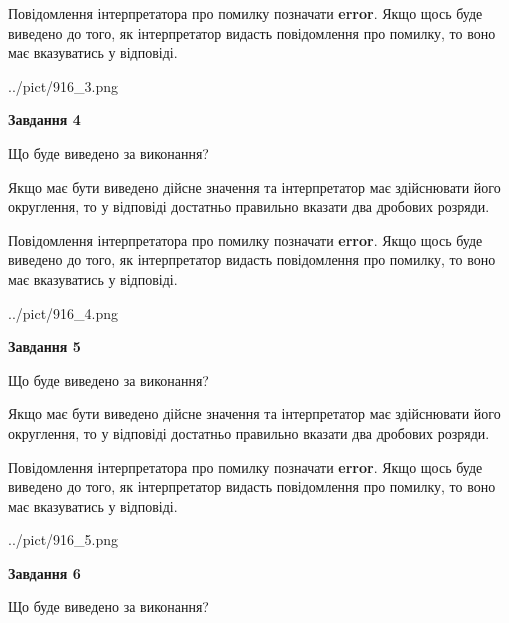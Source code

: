 \documentclass[12pt, ukrainian]{article}
\begin{document}
{\begin {Large}
Повідомлення інтерпретатора про помилку позначати \textbf{error}.
Якщо щось буде виведено до того, як інтерпретатор видасть повідомлення про помилку, 
то воно має вказуватись у відповіді. \par

\begin{center}
	{../pict/916_3.png}
\end{center}
\newpage

{\begin {center}\textbf{Завдання 4}\end {center}}\par
Що буде виведено за виконання? \par

Якщо має бути виведено дійсне значення та інтерпретатор має здійснювати його округлення, 
то у відповіді достатньо правильно вказати два дробових розряди.

Повідомлення інтерпретатора про помилку позначати \textbf{error}.
Якщо щось буде виведено до того, як інтерпретатор видасть повідомлення про помилку, 
то воно має вказуватись у відповіді. \par

\begin{center}
	{../pict/916_4.png}
\end{center}
\newpage

{\begin {center}\textbf{Завдання 5}\end {center}}\par
Що буде виведено за виконання? \par

Якщо має бути виведено дійсне значення та інтерпретатор має здійснювати його округлення, 
то у відповіді достатньо правильно вказати два дробових розряди.

Повідомлення інтерпретатора про помилку позначати \textbf{error}.
Якщо щось буде виведено до того, як інтерпретатор видасть повідомлення про помилку, 
то воно має вказуватись у відповіді. \par

\begin{center}
	{../pict/916_5.png}
\end{center}
\newpage

{\begin {center}\textbf{Завдання 6}\end {center}}\par
Що буде виведено за виконання? \par


\end{Large}}
\end{document}
